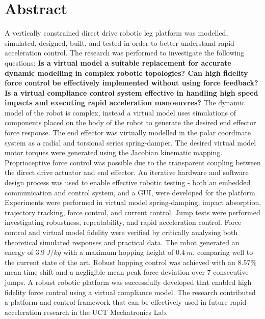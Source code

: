 \chapter{Abstract}

A vertically constrained direct drive robotic leg platform was modelled, simulated, designed, built, and tested in order to better understand rapid acceleration control. The research was performed to investigate the following questions: \textbf{Is a virtual model a suitable replacement for accurate dynamic modelling in complex robotic topologies? Can high fidelity force control be effectively implemented without using force feedback? Is a virtual compliance control system effective in handling high speed impacts and executing rapid acceleration manoeuvres?} The dynamic model of the robot is complex, instead a virtual model uses simulations of components placed on the body of the robot to generate the desired end effector force response. The end effector was virtually modelled in the polar coordinate system as a radial and torsional series spring-damper. The desired virtual model motor torques were generated using the Jacobian kinematic mapping. Proprioceptive force control was possible due to the transparent coupling between the direct drive actuator and end effector. An iterative hardware and software design process was used to enable effective robotic testing - both an embedded communication and control system, and a GUI, were developed for the platform. Experiments were performed in virtual model spring-damping, impact absorption, trajectory tracking, force control, and current control. Jump tests were performed investigating robustness, repeatability, and rapid acceleration control. Force control and virtual model fidelity were verified by critically analysing both theoretical simulated responses and practical data. The robot generated an energy of $3.9\ J/kg$ with a maximum hopping height of $0.4\ m$, comparing well to the current state of the art. Robust hopping control was achieved with an $8.57\%$ mean time shift and a negligible mean peak force deviation over 7 consecutive jumps. A robust robotic platform was successfully developed that enabled high fidelity force control using a virtual compliance model. The research contributed a platform and control framework that can be effectively used in future rapid acceleration research in the UCT Mechatronics Lab.

